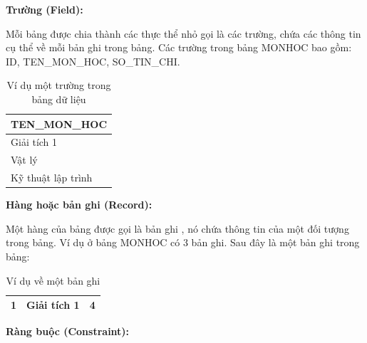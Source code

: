 \textbf{Trường (Field):}
	
	Mỗi bảng được chia thành các thực thể nhỏ gọi là các trường, chứa các thông tin cụ thể về mỗi bản ghi trong bảng. Các trường trong bảng MONHOC bao gồm: ID, TEN\_MON\_HOC, SO\_TIN\_CHI.\\
	\begin{table}[H]
	    \centering
	    \begin{tabular}{|l|}
	        \hline
	        \textbf{TEN\_MON\_HOC}\\
	        \hline
	        Giải tích 1\\
	        \hline
	        Vật lý\\
	        \hline
	        Kỹ thuật lập trình\\
	        \hline
	    \end{tabular}
	    \caption{Ví dụ một trường trong bảng dữ liệu}
	\end{table}
	
\textbf{Hàng hoặc bản ghi (Record):}
	
Một hàng của bảng được gọi là bản ghi , nó chứa thông tin của một đối tượng trong bảng. Ví dụ ở bảng MONHOC có 3 bản ghi. Sau đây là một bản ghi trong bảng:\\
\begin{table}[H]
    \centering
    \begin{tabular}{|r|r|r|}
        \hline
		1&Giải tích 1&4\\
		\hline
    \end{tabular}
    \caption{Ví dụ về một bản ghi}
\end{table}

\textbf{Ràng buộc (Constraint):}

